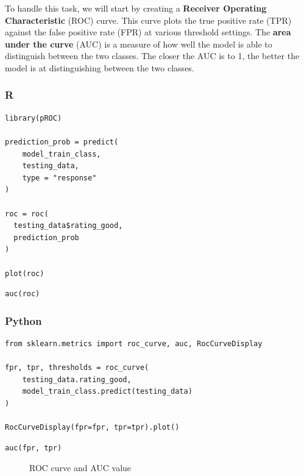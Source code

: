 \documentclass[
  letterpaper,
]{krantz}
\begin{document}
To handle this task, we will start by creating a \textbf{Receiver
Operating Characteristic} (ROC) curve. This curve plots the true
positive rate (TPR) against the false positive rate (FPR) at various
threshold settings. The \textbf{area under the curve} (AUC) is a measure
of how well the model is able to distinguish between the two classes.
The closer the AUC is to 1, the better the model is at distinguishing
between the two classes.

\subsubsection{R}

\begin{verbatim}
library(pROC)

prediction_prob = predict(
    model_train_class,
    testing_data,
    type = "response"
)

roc = roc(
  testing_data$rating_good, 
  prediction_prob
)

plot(roc)
\end{verbatim}

\begin{verbatim}
auc(roc)
\end{verbatim}

\subsubsection{Python}

\begin{verbatim}
from sklearn.metrics import roc_curve, auc, RocCurveDisplay

fpr, tpr, thresholds = roc_curve(
    testing_data.rating_good, 
    model_train_class.predict(testing_data)
)

RocCurveDisplay(fpr=fpr, tpr=tpr).plot()
\end{verbatim}

\begin{verbatim}
auc(fpr, tpr)
\end{verbatim}

\begin{figure}[H]


\caption{\label{fig-pretty-roc-auc}ROC curve and AUC value}

\end{figure}%
\end{document}
